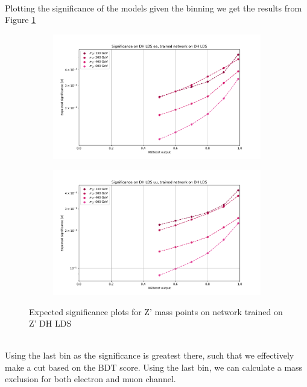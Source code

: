 \documentclass[14pt, a4paper]{book}
\begin{document}
\\Plotting the significance of the models given the binning we get the results from Figure \ref{fig:DH_LDS_exp_sig}
\begin{figure}[!ht]
	\centering
	\begin{subfigure}[b]{0.49\textwidth}
      \centering
      \includegraphics[width=1\textwidth]{XGBoost/DH_LDS/EXP_SIG_ee.pdf}
      \end{subfigure}
   \hfill
   \begin{subfigure}[b]{0.49\textwidth}
      \centering
      \includegraphics[width=1\textwidth]{XGBoost/DH_LDS/EXP_SIG_uu.pdf}
      \end{subfigure}
   \caption{Expected significance plots for Z' mass points on network trained on Z' DH LDS}\label{fig:DH_LDS_exp_sig}
\end{figure}
\\Using the last bin as the significance is greatest there, such that we effectively make a cut based on the BDT score. Using the last bin, we can calculate a mass exclusion for both electron and muon channel.\\
\end{document}
